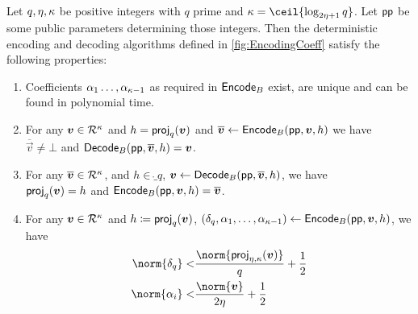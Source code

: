 \begin{lemma}\label{lem:latencode}
Let $q,\eta,\kappa$ be positive integers with $q$ prime and $\limbs = \ceil{\log_{2\eta+1}q}$. Let $\mathsf{pp}$ be some public parameters determining those integers.
Then the deterministic encoding and decoding algorithms defined in \autoref{fig:EncodingCoeff} satisfy the following properties:
\begin{enumerate}
 \item Coefficients $\alpha_1\ldots,\alpha_{\kappa-1}$ as required in $\mathsf{Encode}_B$ exist, are unique and can be found in polynomial time.\label{item:basis}
 \item For any $\boldsymbol{v}\in\mathcal{R}^\kappa$ and $h = \mathsf{proj}_{q}(\boldsymbol{v})$ and $\overline{\boldsymbol{v}} \gets \mathsf{Encode}_B(\mathsf{pp}, \boldsymbol{v}, h)$ we have\\
 $\overline{\vec{v}}\neq \bot$ and $\mathsf{Decode}_B(\mathsf{pp}, \overline{\boldsymbol{v}}, h) = \boldsymbol{v}$.\label{item:inverse1}
 \item For any $\overline{\boldsymbol{v}}\in\mathcal{R}^\kappa$, and $h\in\ring_q$, $\boldsymbol{v}\gets\mathsf{Decode}_B(\mathsf{pp}, \overline{\boldsymbol{v}}, h)$, we have\\
 $\mathsf{proj}_{q}(\boldsymbol{v})  = h$ and $\mathsf{Encode}_B(\mathsf{pp}, \boldsymbol{v}, h) = \overline{\boldsymbol{v}}$.\label{item:inverse2}
 \item For any $\boldsymbol{v}\in\mathcal{R}^\kappa$ and $h \coloneqq \mathsf{proj}_{q}(\boldsymbol{v})$, $(\delta_q,\alpha_1,\ldots,\alpha_{\kappa-1}) \gets \mathsf{Encode}_B(\mathsf{pp},\boldsymbol{v},h)$, we have
 \begin{align*}
   \norm{\delta_q} <& \frac{\norm{\projring(\vec{v})}}{q} + \frac{1}{2}\\
   \norm{\alpha_i} <& \frac{\norm{\vec{v}}}{2\eta} + \frac{1}{2} 
 \end{align*}\label{item:latencodebounds}
\end{enumerate}
\end{lemma}
